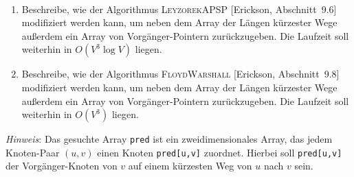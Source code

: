 \documentclass{uebung_cs}
\begin{document}
\begin{aufgabe}
\ 
  \begin{enumerate}
    \item Beschreibe, wie der Algorithmus \textsc{LeyzorekAPSP} [Erickson, Abschnitt~9.6] modifiziert werden kann, um neben dem Array der Längen kürzester Wege außerdem ein Array von Vorgänger-Pointern zurückzugeben.
    Die Laufzeit soll weiterhin in $O(V^3 \log V)$ liegen.
    \item Beschreibe, wie der Algorithmus \textsc{FloydWarshall} [Erickson, Abschnitt~9.8] modifiziert werden kann, um neben dem Array der Längen kürzester Wege außerdem ein Array von Vorgänger-Pointern zurückzugeben.
    Die Laufzeit soll weiterhin in $O(V^3)$ liegen.
  \end{enumerate}
  \emph{Hinweis}: Das gesuchte Array \texttt{pred} ist ein zweidimensionales Array, das jedem Knoten-Paar $(u,v)$ einen Knoten \texttt{pred[u,v]} zuordnet. Hierbei soll \texttt{pred[u,v]} der Vorgänger-Knoten von $v$ auf einem kürzesten Weg von $u$ nach $v$ sein.
\end{aufgabe}

\end{document}
